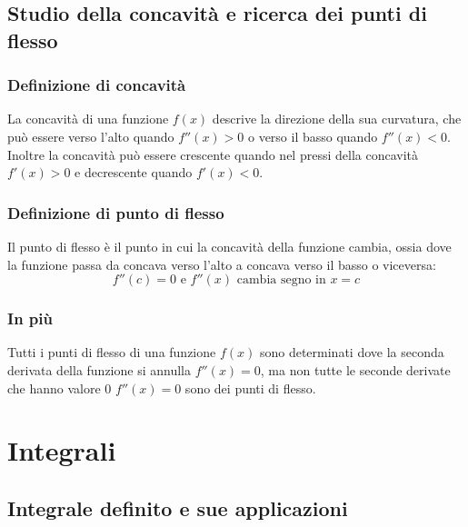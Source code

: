 \documentclass{article}
\begin{document}
\newpage
\subsection{Studio della concavità e ricerca dei punti di flesso}
\subsubsection{Definizione di concavità}
La concavità di una funzione \(f(x)\) descrive la direzione della sua curvatura, che può
essere verso l'alto quando \(f''(x)>0\) o verso il basso quando \(f''(x)<0\).\\
Inoltre la concavità può essere crescente quando nel pressi della concavità \(f'(x)>0\) e 
decrescente quando \(f'(x)<0\).

\subsubsection{Definizione di punto di flesso}
Il punto di flesso è il punto in cui la concavità della funzione cambia, ossia dove la
funzione passa da concava verso l'alto a concava verso il basso o viceversa:
\begin{equation*}
    f''(c) = 0 \text{ e } f''(x) \text{ cambia segno in } x=c
\end{equation*}

\subsubsection{In più}
Tutti i punti di flesso di una funzione \(f(x)\) sono determinati dove la seconda derivata
della funzione si annulla \(f''(x)=0\), ma non tutte le seconde derivate che hanno valore 0
\(f''(x)=0\) sono dei punti di flesso.

\newpage
\section{Integrali}
\subsection{Integrale definito e sue applicazioni}
\end{document}

